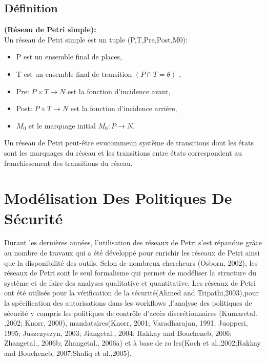 \subsection{Définition}

\begin{defn}\textbf{\textbf{(Réseau de Petri simple):}}
	\\
Un réseau de Petri simple est un tuple
 (P,T,Pre,Post,M0):
 
 \begin{itemize}
\item  	P est un ensemble final de places,
\item T est un ensemble final de transition $ (P \cap T = \theta ) $ ,
\item Pre: $P \times T \to N$ est la fonction d'incidence avant,
\item Post: $P \times T \to N$ est la fonction d'incidence arriére,
\item $M_{0}$ et le marquage initial $M_{0}:  P \to N$.
  \end{itemize}

\end{defn}




Un réseau de Petri peut-être evucommeun système de transitions dont les états sont les marquages du réseau et les transitions entre états correspondent au franchissement des transitions du réseau.




\section{Modélisation Des Politiques De Sécurité}

Durant les dernières années, l'utilisation des réseaux de Petri s'est répandue grâce au nombre de travaux qui a été développé pour enrichir les réseaux de Petri ainsi que la disponibilité des outils. Selon de nombreux chercheurs (Osborn, 2002), les réseaux de Petri sont le seul formalisme qui permet de modéliser la structure du système et de faire des analyses qualitative et quantitative. Les réseaux de Petri ont été utilisés pour la vérification de la sécurité(Ahmed and Tripathi,2003),pour la spécification des autorisations dans les workflows \parencite{ESORICS'96},l'analyse des politiques de sécurité y compris les politiques de contrôle d'accès discrétionnaires (Kumaretal. ,2002; Knorr, 2000), mandataires(Knorr, 2001; Varadharajan, 1991; Juopperi, 1995; Juszczyszyn, 2003; Jiangetal., 2004; Rakkay and Boucheneb, 2006; Zhangetal., 2006b; Zhangetal., 2006a) et à base de ro les(Koch et al.,2002;Rakkay and Boucheneb, 2007;Shafiq et al.,2005).

 














